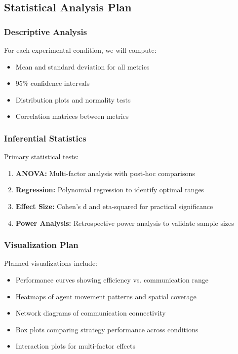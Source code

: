 \documentclass[12pt,a4paper]{article}
\begin{document}
\subsection{Statistical Analysis Plan}

\subsubsection{Descriptive Analysis}

For each experimental condition, we will compute:

\begin{itemize}
    \item Mean and standard deviation for all metrics
    \item 95\% confidence intervals
    \item Distribution plots and normality tests
    \item Correlation matrices between metrics
\end{itemize}

\subsubsection{Inferential Statistics}

Primary statistical tests:

\begin{enumerate}
    \item \textbf{ANOVA:} Multi-factor analysis with post-hoc comparisons
    \item \textbf{Regression:} Polynomial regression to identify optimal ranges
    \item \textbf{Effect Size:} Cohen's d and eta-squared for practical significance
    \item \textbf{Power Analysis:} Retrospective power analysis to validate sample sizes
\end{enumerate}

\subsubsection{Visualization Plan}

Planned visualizations include:

\begin{itemize}
    \item Performance curves showing efficiency vs. communication range
    \item Heatmaps of agent movement patterns and spatial coverage
    \item Network diagrams of communication connectivity
    \item Box plots comparing strategy performance across conditions
    \item Interaction plots for multi-factor effects
\end{itemize}
\end{document}
